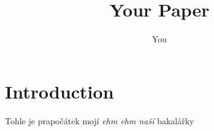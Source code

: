 \documentclass{article}
\title{Your Paper}
\author{You}
\begin{document}
\maketitle

\section{Introduction}

Tohle je prapočátek mojí \textit{ehm ehm naší} bakalářky
\end{document}
